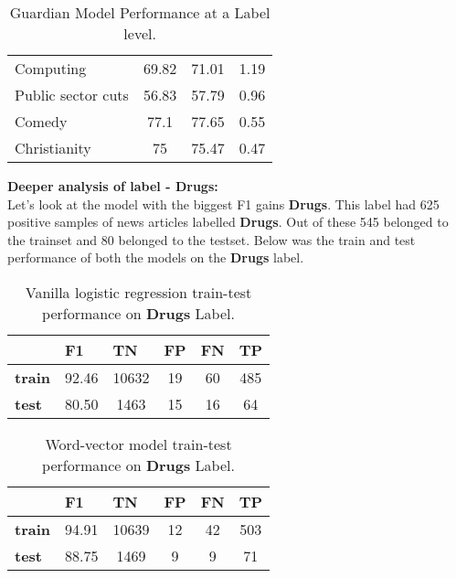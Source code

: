 \begin{table}[htbp]
\begin{tabular}{l|c|c|c|}
Computing                  & 69.82                                                            & 71.01                                                        & 1.19                                                              \\
Public sector cuts         & 56.83                                                            & 57.79                                                        & 0.96                                                              \\
Comedy                     & 77.1                                                             & 77.65                                                        & 0.55                                                              \\
Christianity               & 75                                                               & 75.47                                                        & 0.47                                                             
\end{tabular}
\caption{\label{tab:widgets}Guardian Model Performance at a Label level.}
\end{table}

\noindent \textbf{Deeper analysis of label - Drugs:}\\

Let's look at the model with the biggest F1 gains \textbf{Drugs}. This label had 625 positive samples of news articles labelled \textbf{Drugs}. Out of these 545 belonged to the trainset and 80 belonged to the testset. Below was the train and test performance of both the models on the \textbf{Drugs} label.

\begin{table}[htbp]
\centering
\begin{tabular}{l|c|c|c|c|c|}
 & \multicolumn{1}{l|}{\textbf{F1}} & \multicolumn{1}{l|}{\textbf{TN}} & \multicolumn{1}{l|}{\textbf{FP}} & \multicolumn{1}{l|}{\textbf{FN}} & \multicolumn{1}{l|}{\textbf{TP}} \\ \hline
\textbf{train} & 92.46 & 10632 & 19 & 60 & 485 \\
\textbf{test} & 80.50 & 1463 & 15 & 16 & 64
\end{tabular}
\caption{\label{tab:widgets}Vanilla logistic regression train-test performance on \textbf{Drugs} Label.}
\end{table}

\begin{table}[htbp]
\centering
\begin{tabular}{l|c|c|c|c|c|}
 & \multicolumn{1}{l|}{\textbf{F1}} & \multicolumn{1}{l|}{\textbf{TN}} & \multicolumn{1}{l|}{\textbf{FP}} & \multicolumn{1}{l|}{\textbf{FN}} & \multicolumn{1}{l|}{\textbf{TP}} \\ \hline
\textbf{train} & 94.91 & 10639 & 12 & 42 & 503 \\
\textbf{test} & 88.75 & 1469 & 9 & 9 & 71
\end{tabular}
\caption{\label{tab:widgets}Word-vector model train-test performance on \textbf{Drugs} Label.}
\end{table}

